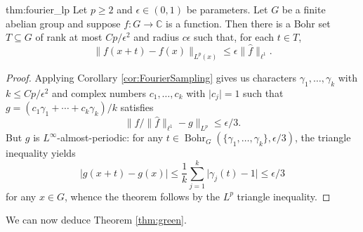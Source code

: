 \documentclass[12pt,a4paper,reqno]{amsart}
\numberwithin{equation}{section}
\theoremstyle{plain}
\theoremstyle{definition}
\renewcommand{\leq}{\leqslant}
\renewcommand{\geq}{\geqslant}
\renewcommand{\subset}{\subseteq}
\def\C{\mathbb{C}}
\def\fhat{\widehat{f}}
\DeclareMathOperator{\Bohr}{Bohr}
\providecommand{\abs}[1]{\lvert#1\rvert}
\providecommand{\norm}[1]{\lVert #1 \rVert}
\theoremstyle{plain}
\begin{document}
\begin{reptheorem}{thm:fourier_lp}
Let $p \geq 2$ and $\epsilon \in (0,1)$ be parameters. Let $G$ be a finite abelian group and suppose $f : G \to \C$ is a function. Then there is a Bohr set $T \subset G$ of rank at most $Cp/\epsilon^2$ and radius $c\epsilon$ such that, for each $t \in T$,
\[ \norm{ f(x+t) - f(x) }_{L^p(x)} \leq \epsilon \norm{\fhat}_{\ell^1}. \]
\end{reptheorem}
\begin{proof}
Applying Corollary \ref{cor:FourierSampling} gives us characters $\gamma_1, \ldots, \gamma_k$ with $k \leq Cp/\epsilon^2$ and complex numbers $c_1, \ldots, c_k$ with $\abs{c_j} = 1$ such that $g = (c_1 \gamma_1 + \cdots + c_k \gamma_k)/k$ satisfies
\[ \norm{ f/\norm{\fhat}_{\ell^1} - g }_{L^p} \leq \epsilon/3. \]
But $g$ is $L^{\infty}$-almost-periodic: for any $t \in \Bohr_G(\{ \gamma_1, \ldots, \gamma_k \}, \epsilon/3)$, the triangle inequality yields
\[ \abs{g(x+t) - g(x)} \leq \frac{1}{k}\sum_{j=1}^k \abs{ \gamma_j(t) - 1 } \leq \epsilon/3 \]
for any $x \in G$, whence the theorem follows by the $L^p$ triangle inequality.
\end{proof}

We can now deduce Theorem \ref{thm:green}.
\end{document}
